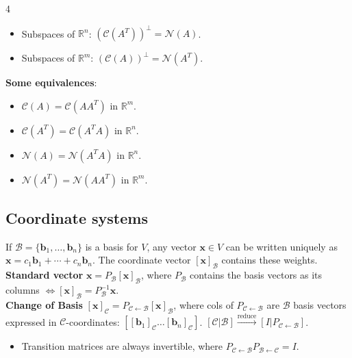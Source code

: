 \documentclass[9pt]{extarticle}
\begin{document}
\begin{multicols*}{4}
\begin{itemize}
    \item Subspaces of $\mathbb{R}^n$: $(\mathcal{C}(A^T))^\perp = \mathcal{N}(A)$.
    \item Subspaces of $\mathbb{R}^m$: $(\mathcal{C}(A))^\perp = \mathcal{N}(A^T)$. 
\end{itemize}
\textbf{Some equivalences}:
\begin{itemize}
    \item $\mathcal{C}(A)=\mathcal{C}(AA^T)$ in $\mathbb{R}^m$.
    \item $\mathcal{C}(A^T)=\mathcal{C}(A^TA)$ in $\mathbb{R}^n$.
    \item $\mathcal{N}(A)=\mathcal{N}(A^TA)$ in $\mathbb{R}^n$.
    \item $\mathcal{N}(A^T)=\mathcal{N}(AA^T)$ in $\mathbb{R}^m$.
\end{itemize}

\subsection*{Coordinate systems}
If $\mathcal{B}=\{\mathbf{b}_{1},\dots,\mathbf{b}_{n}\}$ is a basis for $V$, any vector $\mathbf{x} \in V$ can be written uniquely as $\mathbf{x}=c_{1}\mathbf{b}_{1}+\cdots+c_{n}\mathbf{b}_{n}$.
The coordinate vector $[\mathbf{x}]_{\mathcal{B}}$ contains these weights.\\
\textbf{Standard vector} $\mathbf{x}=P_{\mathcal{B}}[\mathbf{x}]_{\mathcal{B}}$, where $P_{\mathcal{B}}$ contains the basis vectors as its columns $\Leftrightarrow [\mathbf{x}]_\mathcal{B} = P_{\mathcal{B}}^{-1}\mathbf{x}$.\\
\textbf{Change of Basis} $[\mathbf{x}]_{\mathcal{C}}=P_{\mathcal{C}\leftarrow\mathcal{B}}[\mathbf{x}]_{\mathcal{B}}$, where cols of $P_{\mathcal{C}\leftarrow\mathcal{B}}$ are $\mathcal{B}$ basis vectors expressed in $\mathcal{C}$-coordinates: $[[\mathbf{b}_{1}]_{\mathcal{C}}\dots[\mathbf{b}_{n}]_{\mathcal{C}}]$.
$[\mathcal{C}|\mathcal{B}] \xrightarrow{\text{reduce}} [I|P_{\mathcal{C}\leftarrow\mathcal{B}}]$.\\
\begin{itemize}
    \item Transition matrices are always invertible, where $P_{\mathcal{C}\leftarrow\mathcal{B}} P_{\mathcal{B}\leftarrow\mathcal{C}} = I$.
\end{itemize}


\end{multicols*}
\end{document}
